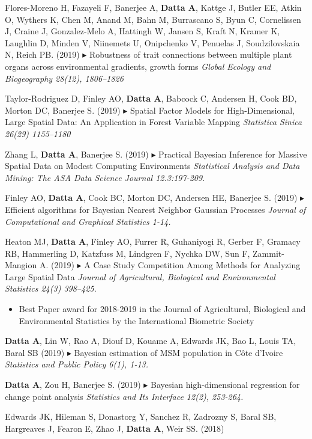 \documentclass[12pt]{article}
\newcommand{\mine}{
  \addtocounter{enumi}{1}
\item[\fcolorbox{white}{grey}{\color{white} \tiny \arabic{enumi}}]
}
\newcommand{\dg}[1]{{\color{black} $\blacktriangleright$ {#1}}}
\begin{document}
\item Flores-Moreno H, Fazayeli F, Banerjee A, \textbf{Datta A}, Kattge J, Butler EE, Atkin O,
Wythers K, Chen M, Anand M, Bahn M, Burrascano S, Byun C, Cornelissen J,
Craine J, Gonzalez-Melo A, Hattingh W, Jansen S, Kraft N, Kramer K, Laughlin 
D, Minden V, Niinemets U, Onipchenko V, Penuelas J, Soudzilovskaia N, Reich 
PB. (2019) {\dg Robustness of trait connections between multiple plant organs across
	environmental gradients, growth forms} {\it Global Ecology and Biogeography 28(12), 1806--1826}
\item Taylor-Rodriguez D, Finley AO, \textbf{Datta A}, Babcock C, Andersen H, Cook BD,
Morton DC, Banerjee S. (2019)
{\dg Spatial Factor Models for High-Dimensional, Large Spatial Data: An Application in Forest Variable Mapping}
{\it Statistica Sinica 26(29) 1155--1180}
\item Zhang L, \textbf{Datta A}, Banerjee S. (2019) {\dg Practical Bayesian Inference for Massive Spatial Data on Modest Computing Environments}
{\it Statistical Analysis and Data Mining: The ASA Data Science Journal 12.3:197-209.}
\item Finley AO, \textbf{Datta A}, Cook BC, Morton DC, Andersen HE, Banerjee S. (2019)
{\dg Efficient algorithms for Bayesian Nearest Neighbor Gaussian Processes}
{\it  Journal of Computational and Graphical Statistics 1-14.}
\item  Heaton MJ, \textbf{Datta A}, Finley AO, Furrer R, Guhaniyogi R, Gerber F, Gramacy RB, Hammerling D, Katzfuss M, Lindgren F, Nychka DW, Sun F, Zammit-Mangion A. (2019)
{\dg A Case Study Competition Among Methods for Analyzing Large Spatial Data}
{\it Journal of Agricultural, Biological and Environmental Statistics 24(3) 398--425.}
\begin{itemize}
	\item Best Paper award for 2018-2019 in the Journal of Agricultural, Biological and Environmental Statistics by the International Biometric Society
\end{itemize}
\mine \textbf{Datta A}, Lin W, Rao A, Diouf D, Kouame A, Edwards JK, Bao L, Louis TA, Baral SB (2019)
{\dg Bayesian estimation of MSM population in Côte d’Ivoire}
{\it  Statistics and Public Policy 6(1), 1-13.}
\mine \textbf{Datta A}, Zou H, Banerjee S. (2019)
{\dg Bayesian high-dimensional regression for change point analysis}
{\it  Statistics and Its Interface 12(2), 253-264.}
\item Edwards JK, Hileman S, Donastorg Y, Sanchez R, Zadrozny S, Baral SB, Hargreaves 
J, Fearon E, Zhao J, \textbf{Datta A}, Weir SS. (2018)
\end{document}
